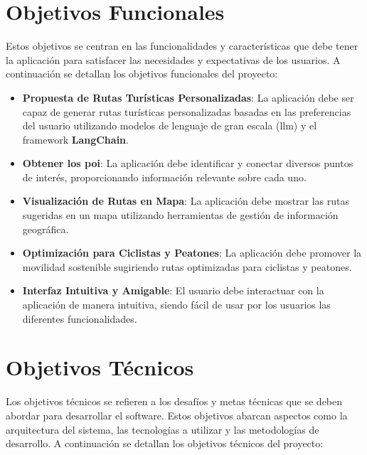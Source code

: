 
\section{Objetivos Funcionales}

Estos objetivos se centran en las funcionalidades y características que debe tener la aplicación para satisfacer las necesidades y expectativas de los usuarios. A continuación se detallan los objetivos funcionales del proyecto:

\begin{itemize}
    \item \textbf{Propuesta de Rutas Turísticas Personalizadas}: La aplicación debe ser capaz de generar rutas turísticas personalizadas basadas en las preferencias del usuario utilizando modelos de lenguaje de gran escala (\acrfull{llm}) y el framework \textbf{LangChain}.
    \item \textbf{Obtener los \acrfull{poi}}: La aplicación debe identificar y conectar diversos puntos de interés, proporcionando información relevante sobre cada uno.
    \item \textbf{Visualización de Rutas en Mapa}: La aplicación debe mostrar las rutas sugeridas en un mapa utilizando herramientas de gestión de información geográfica.
    \item \textbf{Optimización para Ciclistas y Peatones}: La aplicación debe promover la movilidad sostenible sugiriendo rutas optimizadas para ciclistas y peatones.
    \item \textbf{Interfaz Intuitiva y Amigable}: El usuario debe interactuar con la aplicación de manera intuitiva, siendo fácil de usar por los usuarios las diferentes funcionalidades.
\end{itemize}

\section{Objetivos Técnicos}

Los objetivos técnicos se refieren a los desafíos y metas técnicas que se deben abordar para desarrollar el software. Estos objetivos abarcan aspectos como la arquitectura del sistema, las tecnologías a utilizar y las metodologías de desarrollo. A continuación se detallan los objetivos técnicos del proyecto:

